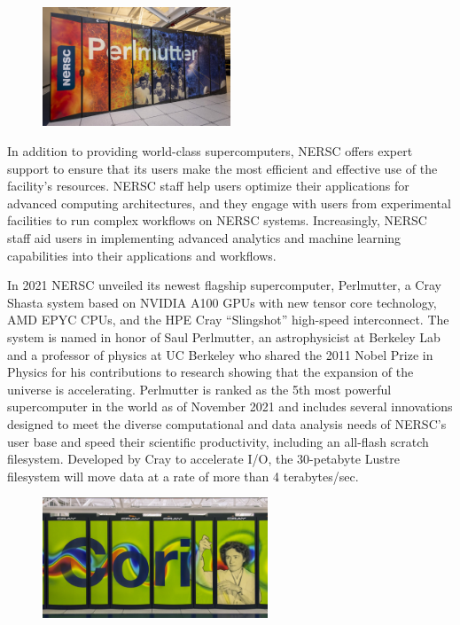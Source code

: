 \begin{figure}[ht]
 \begin{center}
    \includegraphics[width=0.5\textwidth]
    {images/perlmutter.jpg}
 \end{center}
\end{figure}

In addition to providing world-class supercomputers, NERSC offers expert support to ensure that its users make the most efficient and effective use of the facility's resources. NERSC staff help users optimize their applications for advanced computing architectures, and they engage with users from experimental facilities to run complex workflows on NERSC systems. Increasingly, NERSC staff aid users in implementing advanced analytics and machine learning capabilities into their applications and workflows.

In 2021 NERSC unveiled its newest flagship supercomputer, Perlmutter, a Cray Shasta system based on NVIDIA A100 GPUs with new tensor core technology, AMD EPYC CPUs, and the HPE Cray ``Slingshot'' high-speed interconnect. The system is named in honor of Saul Perlmutter, an astrophysicist at Berkeley Lab and a professor of physics at UC Berkeley who shared the 2011 Nobel Prize in Physics for his contributions to research showing that the expansion of the universe is accelerating. Perlmutter is ranked as the 5th most powerful supercomputer in the world as of November 2021 and includes several innovations designed to meet the diverse computational and data analysis needs of NERSC's user base and speed their scientific productivity, including  an all-flash scratch filesystem. Developed by Cray to accelerate I/O, the 30-petabyte Lustre filesystem will move data at a rate of more than 4 terabytes/sec.

\begin{figure}[ht]
 \begin{center}
    \includegraphics[width=0.6\textwidth]
    {images/cori.png}
 \end{center}
\end{figure}

